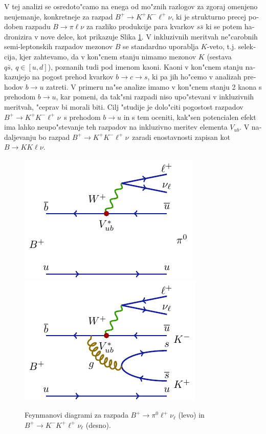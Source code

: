 \documentclass[headings=standardclasses,headings=big,oneside,a4paper,openany,12pt]{scrbook}
\newcommand {\decaya}{$B \to K K \ell \nu$}
\newcommand {\decayb}{$B^+ \to K^+ K^- \ell^+ \nu$}
\begin{document}
\begin{otherlanguage}{slovene}
V tej analizi se osredoto"camo na enega od mo"znih razlogov za zgoraj omenjeno neujemanje, konkretneje za razpad \decayb, ki je strukturno precej podoben razpadu $B \to \pi \ell \nu$ za razliko produkcije para kvarkov $s \bar s$ ki se potem hadronizira v nove delce, kot prikazuje Slika \ref{feynman}. V inkluzivnih meritvah ne"carobnih semi-leptonskih razpadov mezonov $B$ se standardno uporablja $K$-veto, t.j. selekcija, kjer zahtevamo, da v kon"cnem stanju nimamo mezonov $K$ (sestava $q \bar s,~q \in [u,d]$), poznanih tudi pod imenom kaoni. Kaoni v kon"cnem stanju nakazujejo na pogost prehod kvarkov $b \to c \to s$, ki pa jih ho"cemo v analizah prehodov $b \to u$ zatreti. V primeru na"se analize imamo v kon"cnem stanju 2 kaona s prehodom $b \to u$, kar pomeni, da tak"sni razpadi niso upo"stevani v inkluzivnih meritvah, "ceprav bi morali biti. Cilj "studije je dolo"citi pogostost razpadov \decayb~s prehodom $b\to u$ in s tem oceniti, kak"sen potencialen efekt ima lahko neupo"stevanje teh razpadov na inkluzivno meritev elementa $V_{ub}$. V nadaljevanju bo razpad \decayb~zaradi enostavnosti zapisan kot \decaya.
\begin{figure}[H]
\centering
\includegraphics{texfig/B2pilnu}
\hspace{1cm}
\includegraphics{texfig/B2KKlnu}
\caption{Feynmanovi diagrami za razpada $B^+ \to \pi^0 \ell^+ \nu_\ell$ (levo) in $B^+ \to K^- K^+ \ell^+ \nu_\ell$ (desno).}
\label{feynman}
\end{figure}


\end{otherlanguage}
\end{document}
